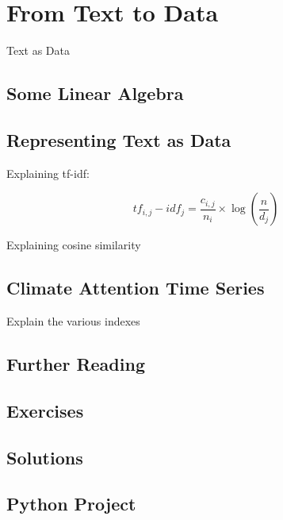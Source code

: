 \chapter{From Text to Data}


 Text as Data

\section{Some Linear Algebra}

\section{Representing Text as Data}

 Explaining tf-idf:

\begin{equation}
tf_{i,j} - idf_{j} = \frac{c_{i,j}}{n_i} \times \log (\frac{n}{d_j})
\end{equation}


Explaining cosine similarity




\section{Climate Attention Time Series}

Explain the various indexes

\section{Further Reading}

\section{Exercises}

\section{Solutions}

\section{Python Project}

